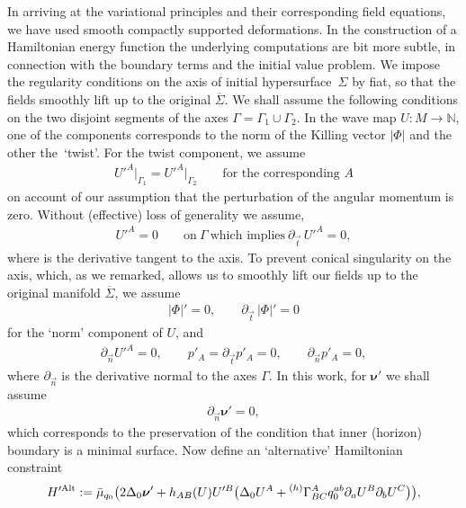 \documentclass[pdftex]{sigma}
\def\ptl{\partial}%
\def\mbo#1{\boldsymbol{#1}}%
\def\olin#1{\overline{#1}{}}%
\newcommand{\leftexp}[2]{{\vphantom{#2}}^{#1}{#2}}
\numberwithin{equation}{section}
\begin{document}
In arriving at the variational principles and their corresponding field equations, we have used smooth compactly supported deformations. In the construction of a Hamiltonian energy function the underlying computations are bit more subtle, in connection with the boundary terms and the initial value problem. We impose the regularity conditions on the axis of initial hypersurface~$\Sigma$ by fiat, so that the fields smoothly lift up to the original $\olin{\Sigma}$. We shall assume the following conditions on the two disjoint segments of the axes $\Gamma = \Gamma_1 \cup \Gamma_2$. In the wave map $U \colon M \to \mathbb{N}$, one of the components corresponds to the norm of the Killing vector $\vert \Phi \vert$ and the other the~`twist'. For the twist component, we assume
\begin{align*}
U'^A\big\vert_{\Gamma_1} = U'^A \big\vert_{\Gamma_2} \qquad \text{for the corresponding $A$}
\end{align*}
on account of our assumption that the perturbation of the angular momentum is zero. Without (effective) loss of generality we assume,
\begin{align*}
U'^A = 0 \qquad \text{on} \ \Gamma \ \text{which implies} \ \ptl_{\vec{t}}\, U'^A=0,
\end{align*}
where \smash{$\ptl_{\vec{t}}$} is the derivative tangent to the axis. To prevent conical singularity on the axis, which, as we remarked, allows us to smoothly lift our fields up to the original manifold $\olin{\Sigma}$, we assume
\begin{align*}
\vert \Phi \vert' =0, \qquad \ptl_{\vec{t}} \, \vert \Phi \vert' =0
\end{align*}
for the `norm' component of $U$, and
\begin{align*}
\ptl_{\vec{n}} U'^A =0, \qquad p'_A =\ptl_{\vec{t}} p'_A =0, \qquad \ptl_{\vec{n}} p'_A =0,
\end{align*}
where $\ptl_{\vec{n}}$ is the derivative normal to the axes $\Gamma$.
In this work, for $\mbo{\nu}'$ we shall assume
\begin{align*}
\ptl_{\vec{n}} \mbo{\nu}' =0,
\end{align*}
which corresponds to the preservation of the condition that inner (horizon) boundary is a minimal surface. Now define an `alternative' Hamiltonian constraint 
\begin{align*}
H'^{{\rm Alt}} := \bar{\mu}_{q_0} \bigl(2 \Delta_0 \mbo{\nu}' + h_{AB}(U) U'^B \bigl(\Delta_0 U^A + \leftexp{(h)}{\Gamma}^A_{BC} q^{ab}_0 \ptl_a U^B \ptl_b U^C\bigr)\bigr),
\end{align*}
\end{document}
